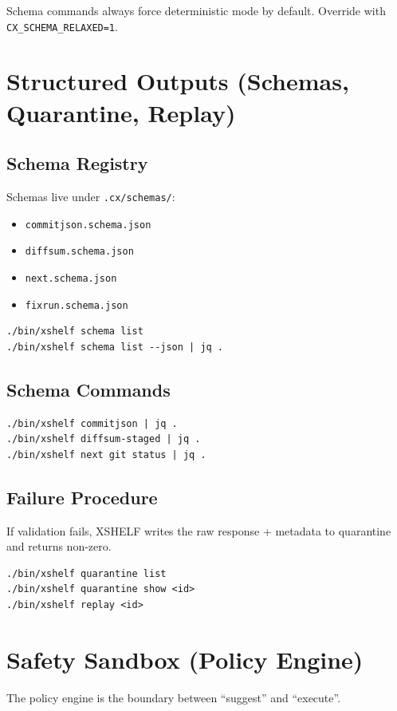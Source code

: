 \documentclass[11pt]{article}
\begin{document}
Schema commands always force deterministic mode by default. Override with \texttt{CX\_SCHEMA\_RELAXED=1}.

\section{Structured Outputs (Schemas, Quarantine, Replay)}
\subsection{Schema Registry}
Schemas live under \texttt{.cx/schemas/}:
\begin{itemize}
  \item \texttt{commitjson.schema.json}
  \item \texttt{diffsum.schema.json}
  \item \texttt{next.schema.json}
  \item \texttt{fixrun.schema.json}
\end{itemize}

\begin{lstlisting}[style=cx]
./bin/xshelf schema list
./bin/xshelf schema list --json | jq .
\end{lstlisting}

\subsection{Schema Commands}
\begin{lstlisting}[style=cx]
./bin/xshelf commitjson | jq .
./bin/xshelf diffsum-staged | jq .
./bin/xshelf next git status | jq .
\end{lstlisting}

\subsection{Failure Procedure}
If validation fails, XSHELF writes the raw response + metadata to quarantine and returns non-zero.

\begin{lstlisting}[style=cx]
./bin/xshelf quarantine list
./bin/xshelf quarantine show <id>
./bin/xshelf replay <id>
\end{lstlisting}

\section{Safety Sandbox (Policy Engine)}
The policy engine is the boundary between ``suggest'' and ``execute''.
\end{document}
